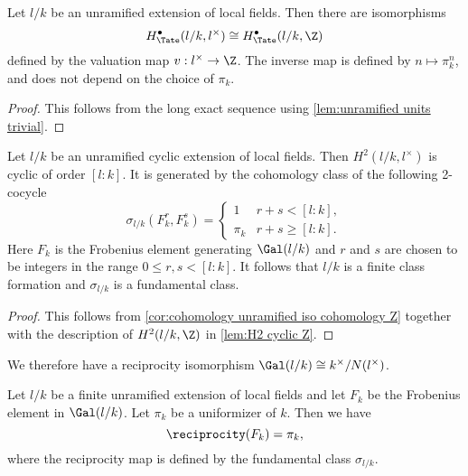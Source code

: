 \begin{corollary} \label{cor:cohomology unramified iso cohomology Z}
	Let $l/k$ be an unramified extension of local fields.
	Then there are isomorphisms
	\[
		H^\bullet_{\Tate}(l/k,l^\times) \cong H^\bullet_{\Tate} (l/k,\Z)
	\]
	defined by the valuation map $v : l^\times \to \Z$.
	The inverse map is defined by $n \mapsto \pi_k^n$, and does not depend on the choice of $\pi_k$.
\end{corollary}

\begin{proof}
	This follows from the long exact sequence using \ref{lem:unramified units trivial}.
\end{proof}


\begin{lemma} \label{lem:unramified fundamental class}
	Let $l/k$ be an unramified cyclic extension of local fields.
	Then $H^2(l/k,l^\times)$ is cyclic of order $[l:k]$.
	It is generated by the cohomology class of the following 2-cocycle
	\[
		\sigma_{l/k} (F_k^r, F_k^s) =
		\begin{cases}
			1 & r + s < [l:k], \\
			\pi_k & r + s \ge [l:k].
		\end{cases}
	\]
	Here $F_k$ is the Frobenius element generating $\Gal(l/k)$ and $r$ and $s$
	are chosen to be integers in the range $0 \le r,s <[l:k]$.
	It follows that $l / k$ is a finite class formation and $\sigma_{l/k}$ is a fundamental class.
\end{lemma}

\begin{proof}
	This follows from \ref{cor:cohomology unramified iso cohomology Z}
	together with the description of $H^2(l/k,\Z)$ in \ref{lem:H2 cyclic Z}.
\end{proof}

We therefore have a reciprocity isomorphism $\Gal(l/k) \cong k^\times / N(l^\times)$.

\begin{lemma} \label{lem:local unramified reciprocity}
	Let $l/k$ be a finite unramified extension of local fields and let $F_k$ be the Frobenius
	element in $\Gal(l/k)$. Let $\pi_k$ be a uniformizer of $k$. Then we have
	\[
		\reciprocity (F_k)= \pi_k,
	\]
	where the reciprocity map is defined by the fundamental class $\sigma_{l/k}$.
\end{lemma}

